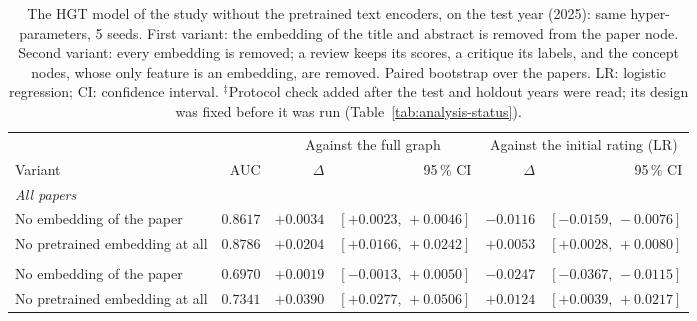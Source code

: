 \begin{table}[t]
\centering
\footnotesize
\setlength{\tabcolsep}{4pt}
\caption{The HGT model of the study without the pretrained text encoders, on the test year (2025): same hyper-parameters, 5 seeds. First variant: the embedding of the title and abstract is removed from the paper node. Second variant: every embedding is removed; a review keeps its scores, a critique its labels, and the concept nodes, whose only feature is an embedding, are removed. Paired bootstrap over the papers. LR: logistic regression; CI: confidence interval. $^{\ddagger}$Protocol check added after the test and holdout years were read; its design was fixed before it was run (Table~\ref{tab:analysis-status}).}
\label{tab:protocol-encoders}
\begin{tabular}{@{}lrrrrr@{}}
\toprule
 & & \multicolumn{2}{c}{Against the full graph} & \multicolumn{2}{c}{Against the initial rating (LR)} \\
\cmidrule(lr){3-4} \cmidrule(lr){5-6}
Variant & AUC & $\Delta$ & 95\,\% CI & $\Delta$ & 95\,\% CI \\
\midrule
\multicolumn{6}{l}{\emph{All papers}} \\
No embedding of the paper & $0.8617$ & $+0.0034$ & $[+0.0023,\,+0.0046]$ & $-0.0116$ & $[-0.0159,\,-0.0076]$ \\
No pretrained embedding at all & $0.8786$ & $+0.0204$ & $[+0.0166,\,+0.0242]$ & $+0.0053$ & $[+0.0028,\,+0.0080]$ \\
\addlinespace
\multicolumn{6}{l}{\emph{Borderline papers}} \\
No embedding of the paper & $0.6970$ & $+0.0019$ & $[-0.0013,\,+0.0050]$ & $-0.0247$ & $[-0.0367,\,-0.0115]$ \\
No pretrained embedding at all & $0.7341$ & $+0.0390$ & $[+0.0277,\,+0.0506]$ & $+0.0124$ & $[+0.0039,\,+0.0217]$ \\
\bottomrule
\end{tabular}
\end{table}
